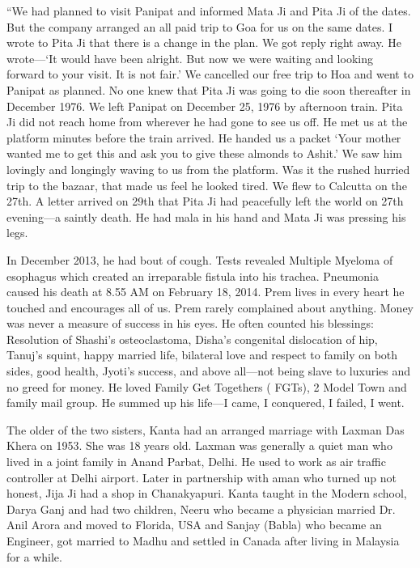 “We had planned to visit Panipat and informed Mata Ji and Pita Ji of the dates. But the company arranged an all paid trip to Goa for us on the same dates. I wrote to Pita Ji that there is a change in the plan. We got reply right away. He wrote—‘It would have been alright. But now we were waiting and looking forward to your visit. It is not fair.’ 
We cancelled our free trip to Hoa and went to Panipat as planned. No one knew that Pita Ji was going to die soon thereafter in December 1976. 
We left Panipat on December 25, 1976 by afternoon train. Pita Ji did not reach home from wherever he had gone to see us off. He met us at the platform minutes before the train arrived. He handed us a packet ‘Your mother wanted me to get this and ask you to give these almonds to Ashit.’ We saw him lovingly and longingly waving to us from the platform. Was it the rushed hurried trip to the bazaar, that made us feel he looked tired. We flew to Calcutta on the 27th. A letter arrived on 29th that Pita Ji had peacefully left the world on 27th evening—a saintly death. He had mala in his hand and Mata Ji was pressing his legs. 


In December 2013, he had bout of cough. Tests revealed Multiple Myeloma of esophagus which created an irreparable fistula into his trachea. Pneumonia caused his death at 8.55 AM on February 18, 2014. Prem lives in every heart he touched and encourages all of us. 
Prem rarely complained about anything. Money was never a measure of success in his eyes. He often counted his blessings: 
Resolution of Shashi’s osteoclastoma, Disha’s congenital dislocation of hip, Tanuj’s squint, happy married life, bilateral love and respect to family on both sides, good health, Jyoti’s success, and above all—not being slave to luxuries and no greed for money. He loved Family Get Togethers ( FGTs), 2 Model Town and family mail group. He summed up his life—I came, I conquered, I failed, I went. 
 


The older of the two sisters, Kanta had an arranged marriage with Laxman Das Khera on        1953. She was 18 years old. Laxman was generally a quiet man who lived in a joint family in Anand Parbat, Delhi. He used to work as air traffic controller at Delhi airport. Later in partnership with aman who turned up not honest, Jija Ji had a shop in Chanakyapuri. Kanta taught in the Modern school, Darya Ganj and had two children, Neeru who became a physician married Dr. Anil Arora and moved to Florida, USA and Sanjay (Babla) who became an Engineer, got married to Madhu and settled in Canada after living in Malaysia for a while. 

